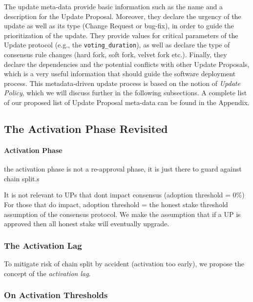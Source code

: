 The update meta-data provide basic information such as the name and a description for the Update Proposal. Moreover, they declare the urgency of the update as well as its type (Change Request or bug-fix), in order to guide the prioritization of the update. They provide values for critical parameters of the Update protocol (e.g., the \verb;voting_duration;), as well as declare the type of consensus rule changes (hard fork, soft fork, velvet fork etc.). Finally, they declare the dependencies and the potential conflicts with other Update Proposals, which is a very useful information that should guide the software deployment process. This metadata-driven update process is  based on the notion of \emph{Update Policy}, which we will discuss further in the following subsections.
A complete list of our proposed list of Update Proposal meta-data can be found in the Appendix. 


\subsection{The Activation Phase Revisited}

\paragraph{Activation Phase} 
the activation phase is not a re-approval phase, it is just there to guard against chain split.s

It is not relevant to UPs that dont impact consensus (adoption threshold = 0\%)
For those that do impact, adoption threshold = the honest stake threshold assumption of the consensus protocol. We make the assumption that if a UP is approved then all honest stake will eventually upgrade.

\subsubsection{The Activation Lag}
To mitigate risk of chain split by accident (activation too early), we propose the concept of the \emph{activation lag}.

\subsubsection{On Activation Thresholds}


